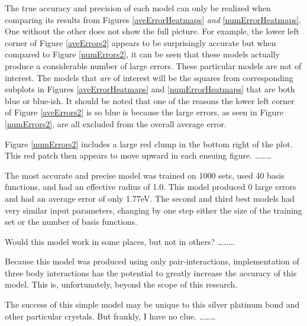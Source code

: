 \par The true accuracy and precision of each model can only be realized when comparing its results from Figures \ref{aveErrorHeatmaps} \textit{and} \ref{numErrorHeatmaps}. One without the other does not show the full picture. For example, the lower left corner of Figure \ref{aveErrors2} appears to be surprisingly accurate but when compared to Figure \ref{numErrors2}, it can be seen that these models actually produce a considerable number of large errors. These particular models are not of interest. The models that \textit{are} of interest will be the squares from corresponding subplots in Figures \ref{aveErrorHeatmaps} and \ref{numErrorHeatmaps} that are both blue or blue-ish. It should be noted that one of the reasons the lower left corner of Figure \ref{aveErrors2} is so blue is because the large errors, as seen in Figure \ref{numErrors2}, are all excluded from the overall average error.
\par Figure \ref{numErrors2} includes a large red clump in the bottom right of the plot. This red patch then appears to move upward in each ensuing figure. \ldots \ldots \ldots
\par The most accurate and precise model was trained on 1000 sets, used 40 basis functions, and had an effective radius of 1.0. This model produced 0 large errors and had an average error of only 1.77eV. The second and third best models had very similar input parameters, changing by one step either the size of the training set or the number of basis functions.
\par Would this model work in some places, but not in others? \ldots \ldots \ldots
\par Because this model was produced using only pair-interactions, implementation of three body interactions has the potential to greatly increase the accuracy of this model. This is, unfortunately, beyond the scope of this research.
\par The success of this simple model may be unique to this silver platinum bond and other particular crystals. But frankly, I have no clue. \ldots\ldots\ldots





